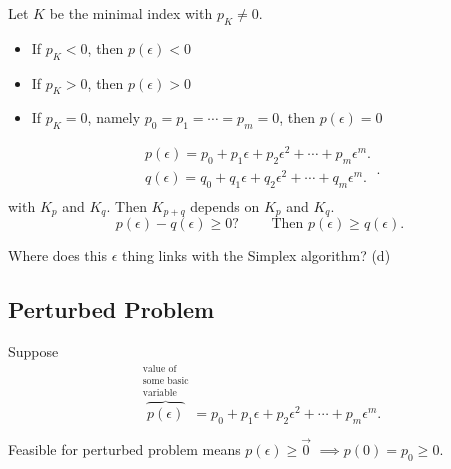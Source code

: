 \begin{definition}
	Let \(K\) be the minimal index with \(p_K \neq 0\).
	\begin{itemize}
		\item If \(p_K < 0\), then \(p(\epsilon) < 0\)
		\item If \(p_K > 0\), then \(p(\epsilon) > 0\)
		\item If \(p_K = 0\), namely \(p_0 = p_1 = \cdots = p_m = 0\), then \(p(\epsilon) = 0\)
	\end{itemize}
\end{definition}

\begin{note}
	\[
		\begin{split}
			p(\epsilon) = p_0 + p_1\epsilon + p_2 \epsilon^2 + \cdots + p_{m}\epsilon^m.	\\
			q(\epsilon) = q_0 + q_1\epsilon + q_2 \epsilon^2 + \cdots + q_{m}\epsilon^m.	\\
		\end{split}.
	\]
	with \(K_p\) and \(K_q\). Then \(K_{p+q}\) depends on \(K_p\) and \(K_q\).
	\[
		p(\epsilon) - q(\epsilon) \geq 0?\qquad \text{ Then }p(\epsilon) \geq  q(\epsilon).
	\]
\end{note}

\begin{problem}
Where does this \(\epsilon \) thing links with the Simplex algorithm? (d)
\end{problem}

\subsection{Perturbed Problem}
Suppose
\[
	\overbrace{p(\epsilon)}^{\substack{\text{value of}\\ \text{some basic}\\ \text{variable}}} = p_0 + p_1 \epsilon + p_2 \epsilon^2 + \cdots + p_m \epsilon^m.
\]

Feasible for perturbed problem means \(p(\epsilon) \geq \vec{0}\) \(\implies p(0) = p_0 \geq 0\).

